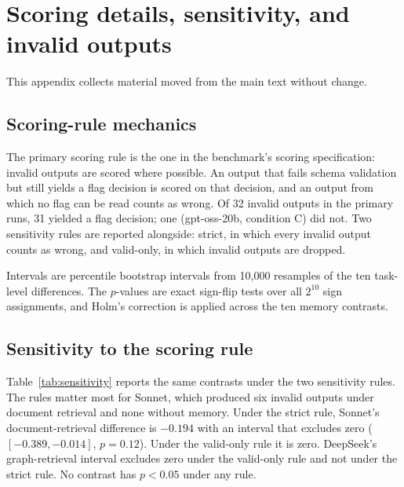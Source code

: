 \documentclass[11pt]{article}
\begin{document}
\section{Scoring details, sensitivity, and invalid outputs}
\label{app:scoring}

This appendix collects material moved from the main text without change.

\subsection*{Scoring-rule mechanics}

The primary scoring rule is the one in the benchmark's scoring specification: invalid outputs are scored where possible. An output that fails schema validation but still yields a flag decision is scored on that decision, and an output from which no flag can be read counts as wrong. Of 32 invalid outputs in the primary runs, 31 yielded a flag decision; one (gpt-oss-20b, condition C) did not. Two sensitivity rules are reported alongside: strict, in which every invalid output counts as wrong, and valid-only, in which invalid outputs are dropped.



Intervals are percentile bootstrap intervals from 10,000 resamples of the ten task-level differences. The $p$-values are exact sign-flip tests over all $2^{10}$ sign assignments, and Holm's correction is applied across the ten memory contrasts.

\subsection*{Sensitivity to the scoring rule}

Table~\ref{tab:sensitivity} reports the same contrasts under the two sensitivity rules. The rules matter most for Sonnet, which produced six invalid outputs under document retrieval and none without memory. Under the strict rule, Sonnet's document-retrieval difference is $-0.194$ with an interval that excludes zero ($[-0.389, -0.014]$, $p = 0.12$). Under the valid-only rule it is zero. DeepSeek's graph-retrieval interval excludes zero under the valid-only rule and not under the strict rule. No contrast has $p < 0.05$ under any rule.
\end{document}
